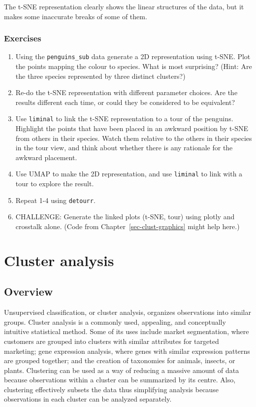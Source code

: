 \documentclass[
  letterpaper,
]{book}
\providecommand{\tightlist}{%
  \setlength{\itemsep}{0pt}\setlength{\parskip}{0pt}}\usepackage{longtable,booktabs,array}
\begin{document}
The t-SNE representation clearly shows the linear structures of the
data, but it makes some inaccurate breaks of some of them.

\hypertarget{exercises-4}{%
\section*{Exercises}\label{exercises-4}}


\begin{enumerate}
\def\labelenumi{\arabic{enumi}.}
\tightlist
\item
  Using the \texttt{penguins\_sub} data generate a 2D representation
  using t-SNE. Plot the points mapping the colour to species. What is
  most surprising? (Hint: Are the three species represented by three
  distinct clusters?)
\item
  Re-do the t-SNE representation with different parameter choices. Are
  the results different each time, or could they be considered to be
  equivalent?
\item
  Use \texttt{liminal} to link the t-SNE representation to a tour of the
  penguins. Highlight the points that have been placed in an awkward
  position by t-SNE from others in their species. Watch them relative to
  the others in their species in the tour view, and think about whether
  there is any rationale for the awkward placement.
\item
  Use UMAP to make the 2D representation, and use \texttt{liminal} to
  link with a tour to explore the result.
\item
  Repeat 1-4 using \texttt{detourr}.
\item
  CHALLENGE: Generate the linked plots (t-SNE, tour) using plotly and
  crosstalk alone. (Code from Chapter~\ref{sec-clust-graphics} might
  help here.)
\end{enumerate}

\part{Cluster analysis}

\hypertarget{overview}{%
\chapter{Overview}\label{overview}}

Unsupervised classification, or cluster analysis, organizes observations
into similar groups. Cluster analysis is a commonly used, appealing, and
conceptually intuitive statistical method. Some of its uses include
market segmentation, where customers are grouped into clusters with
similar attributes for targeted marketing; gene expression analysis,
where genes with similar expression patterns are grouped together; and
the creation of taxonomies for animals, insects, or plants. Clustering
can be used as a way of reducing a massive amount of data because
observations within a cluster can be summarized by its centre. Also,
clustering effectively subsets the data thus simplifying analysis
because observations in each cluster can be analyzed separately.
\end{document}
